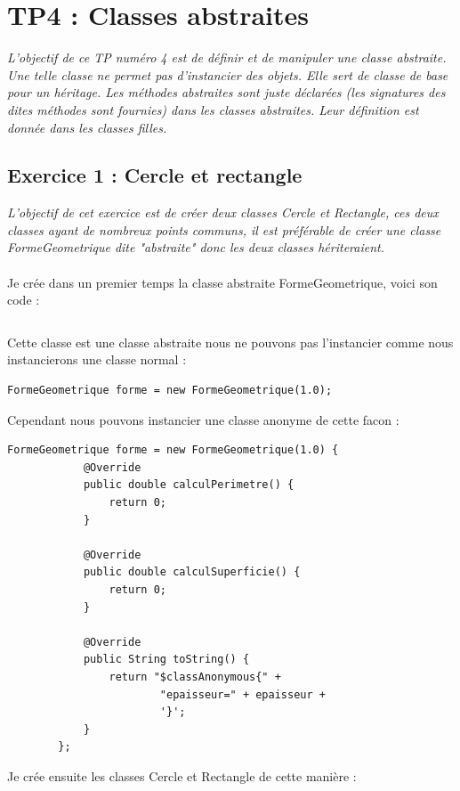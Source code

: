 \chapter{TP4 : Classes abstraites}
\textit{L'objectif de ce TP numéro 4 est de définir et de manipuler une classe abstraite. Une telle classe ne permet pas d'instancier des objets. Elle sert de classe de base pour un héritage. Les méthodes abstraites sont juste déclarées (les signatures des dites méthodes sont fournies) dans les classes abstraites. Leur définition est donnée dans les classes filles.}

\section{Exercice 1 : Cercle et rectangle}
\textit{L'objectif de cet exercice est de créer deux classes Cercle et Rectangle, ces deux classes ayant de nombreux points communs, il est préférable de créer une classe FormeGeometrique dite "abstraite" donc les deux classes hériteraient.}
\\\\
Je crée dans un premier temps la classe abstraite FormeGeometrique, voici son code :
\inputminted[linenos,firstline=3,lastline=23]{java}{../sources/src/tp4/FormeGeometrique.java}
Cette classe est une classe abstraite nous ne pouvons pas l'instancier comme nous instancierons une classe normal :
\begin{verbatim}
FormeGeometrique forme = new FormeGeometrique(1.0);
\end{verbatim}
Cependant nous pouvons instancier une classe anonyme de cette facon :
\begin{verbatim}
FormeGeometrique forme = new FormeGeometrique(1.0) {
            @Override
            public double calculPerimetre() {
                return 0;
            }

            @Override
            public double calculSuperficie() {
                return 0;
            }

            @Override
            public String toString() {
                return "$classAnonymous{" +
                        "epaisseur=" + epaisseur +
                        '}';
            }
        };
\end{verbatim}

Je crée ensuite les classes Cercle et Rectangle de cette manière :
\inputminted[linenos,firstline=3,lastline=33]{java}{../sources/src/tp4/Cercle.java}

